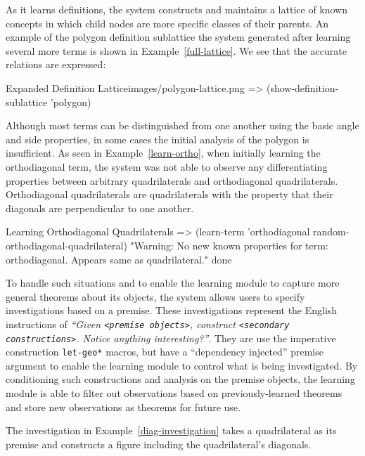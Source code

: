 As it learns definitions, the system constructs and maintains a
lattice of known concepts in which child nodes are more specific
classes of their parents. An example of the polygon definition
sublattice the system generated after learning several more terms is
shown in Example~\ref{full-lattice}. We see that the accurate
relations are expressed:

\begin{img-example}
[label=full-lattice,
breakable=false,
comment style={size=fbox,frame hidden,height=8.5cm}]
{Expanded Definition Lattice}{images/polygon-lattice.png}
=> (show-definition-sublattice 'polygon)
\end{img-example}

Although most terms can be distinguished from one another using the
basic angle and side properties, in some cases the initial analysis of
the polygon is insufficient. As seen in Example~\ref{learn-ortho},
when initially learning the orthodiagonal term, the system was not
able to observe any differentiating properties between arbitrary
quadrilaterals and orthodiagonal quadrilaterals. Orthodiagonal
quadrilaterals are quadrilaterals with the property that their
diagonals are perpendicular to one another.

\begin{repl-example}
[label=learn-ortho]
{Learning Orthodiagonal Quadrilaterals}
=> (learn-term 'orthodiagonal random-orthodiagonal-quadrilateral)
"Warning: No new known properties for term: orthodiagonal. Appears same as quadrilateral."
done

\end{repl-example}

To handle such situations and to enable the learning module to capture
more general theorems about its objects, the system allows users to
specify investigations based on a premise. These investigations
represent the English instructions of \emph{``Given \texttt{<premise
    objects>}, construct \texttt{<secondary constructions>}. Notice
  anything interesting?''}. They are use the imperative construction
\texttt{let-geo*} macros, but have a ``dependency injected'' premise
argument to enable the learning module to control what is being
investigated.  By conditioning such constructions and analysis on the
premise objects, the learning module is able to filter out
observations based on previously-learned theorems and store new
observations as theorems for future use.

The investigation in Example~\ref{diag-investigation} takes a
quadrilateral as its premise and constructs a figure including the
quadrilateral's diagonals.

